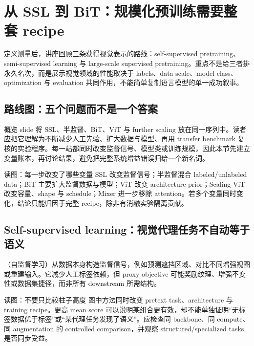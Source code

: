 \section{从 SSL 到 BiT：规模化预训练需要整套 recipe}

定义测量后，讲座回顾三条获得视觉表示的路线：self-supervised pretraining、semi-supervised learning 与 large-scale supervised pretraining。重点不是给三者排永久名次，而是展示视觉领域的性能取决于 labels、data scale、model class、optimization 与 evaluation 共同作用，不能简单复制语言模型的单一成功叙事。

\subsection{路线图：五个问题而不是一个答案}

概览 slide 将 SSL、半监督、BiT、ViT 与 further scaling 放在同一序列中。读者应把它理解为不断减少人工先验、扩大数据与模型、再用 transfer benchmark 复核的实验程序。每一站都同时改变监督信号、模型类或训练规模，因此本节先建立变量账本，再讨论结果，避免把完整系统增益错误归给一个新名词。


\begin{knowledgebox}{读图：每一步改变了哪些变量}
SSL 改变监督信号；半监督混合 labeled/unlabeled data；BiT 主要扩大监督数据与模型；ViT 改变 architecture prior；Scaling ViT 改变容量、shape 与 schedule；Mixer 进一步移除 attention。若多个变量同时变化，结论只能归因于完整 recipe，除非有消融实验隔离贡献。
\end{knowledgebox}

\subsection{Self-supervised learning：视觉代理任务不自动等于语义}

（自监督学习）从数据本身构造监督信号，例如预测遮挡区域、对比不同增强视图或重建输入。它减少人工标签依赖，但 proxy objective 可能奖励纹理、增强不变性或数据集捷径，而非所有 downstream 所需结构。


\begin{knowledgebox}{读图：不要只比较柱子高度}
图中方法同时改变 pretext task、architecture 与 training recipe。更高 mean score 可以说明某组合更有效，却不能单独证明“无标签数据优于标签”或“某代理任务发现了语义”。应检查同 backbone、同 compute、同 augmentation 的 controlled comparison，并观察 structured/specialized tasks 是否同步受益。
\end{knowledgebox}

